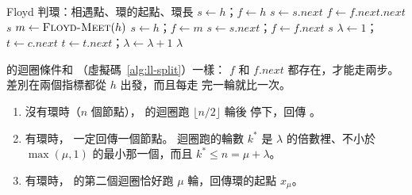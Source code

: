 \begin{pseudo}[label=alg:ll-floyd]{Floyd 判環：相遇點、環的起點、環長}
 
    \State $s \gets h$；$f \gets h$
        \State $s \gets s.\mathit{next}$
        \State $f \gets f.\mathit{next}.\mathit{next}$
            \State \Return $s$
        \EndIf
    \EndWhile
    \State \Return \NIL
\EndFunction
\Statex
{}
    \State $m \gets \Call{Floyd-Meet}{h}$
        \State \Return \NIL {}
    \EndIf
    \State $s \gets h$；$f \gets m$ 
        \State $s \gets s.\mathit{next}$；$f \gets f.\mathit{next}$ 
    \EndWhile
    \State \Return $s$
\EndFunction
\Statex
{} 
    \State $\lambda \gets 1$；$t \gets c.\mathit{next}$
        \State $t \gets t.\mathit{next}$；$\lambda \gets \lambda + 1$
    \EndWhile
    \State \Return $\lambda$
\EndFunction
\end{pseudo}

 的迴圈條件和 （虛擬碼~\ref{alg:ll-split}）一樣：
$f$ 和 $f.\mathit{next}$ 都存在，才能走兩步。 差別在兩個指標都從 $h$ 出發，而且每走
完一輪就比一次。

\begin{theorem}
\label{thm:ll-floyd}
\begin{enumerate}
\item 沒有環時（$n$ 個節點）， 的迴圈跑 $\lfloor n/2 \rfloor$ 輪後
停下，回傳 \NIL。
\item 有環時， 一定回傳一個節點。 迴圈跑的輪數 $k^*$ 是
$\lambda$ 的倍數裡、不小於 $\max(\mu, 1)$ 的最小那一個，而且 $k^* \le n = \mu +
\lambda$。
\item 有環時， 的第二個迴圈恰好跑 $\mu$ 輪，回傳環的起點
$x_\mu$。
\end{enumerate}
\end{theorem}

